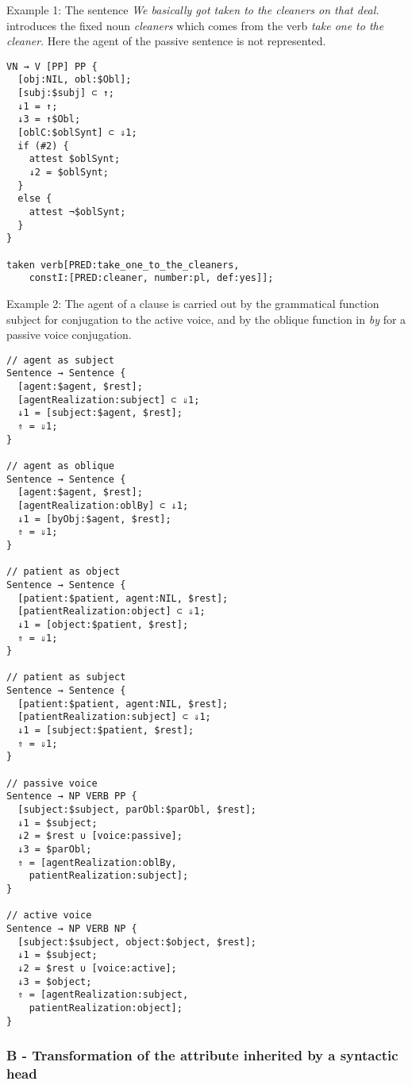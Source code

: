 \documentclass[11pt]{article}
\begin{document}
Example 1: The sentence \textit{We basically got taken to the cleaners
  on that deal.} introduces the fixed noun \textit{cleaners} which
comes from the verb \textit{take one to the cleaner}. Here the agent of the
passive sentence is not represented.

\begin{lstlisting}
VN → V [PP] PP {
  [obj:NIL, obl:$Obl];
  [subj:$subj] ⊂ ↑;
  ↓1 = ↑;
  ↓3 = ↑$Obl;
  [oblC:$oblSynt] ⊂ ⇓1;
  if (#2) {
    attest $oblSynt;
    ↓2 = $oblSynt;
  }
  else {
    attest ¬$oblSynt;
  }
}

taken verb[PRED:take_one_to_the_cleaners, 
	constI:[PRED:cleaner, number:pl, def:yes]];
\end{lstlisting}

Example 2:
The agent of a clause is carried out by the grammatical function subject
for conjugation to the active voice, and by the oblique function in
\textit{by} for a passive voice conjugation.

\begin{lstlisting}
// agent as subject
Sentence → Sentence {
  [agent:$agent, $rest];
  [agentRealization:subject] ⊂ ⇓1;
  ↓1 = [subject:$agent, $rest];
  ⇑ = ⇓1;
}

// agent as oblique
Sentence → Sentence {
  [agent:$agent, $rest];
  [agentRealization:oblBy] ⊂ ⇓1;
  ↓1 = [byObj:$agent, $rest];
  ⇑ = ⇓1;
}

// patient as object
Sentence → Sentence {
  [patient:$patient, agent:NIL, $rest];
  [patientRealization:object] ⊂ ⇓1;
  ↓1 = [object:$patient, $rest];
  ⇑ = ⇓1;
}

// patient as subject
Sentence → Sentence {
  [patient:$patient, agent:NIL, $rest];
  [patientRealization:subject] ⊂ ⇓1;
  ↓1 = [subject:$patient, $rest];
  ⇑ = ⇓1;
}

// passive voice
Sentence → NP VERB PP {
  [subject:$subject, parObl:$parObl, $rest];
  ↓1 = $subject;
  ↓2 = $rest ∪ [voice:passive];
  ↓3 = $parObl;
  ⇑ = [agentRealization:oblBy, 
	patientRealization:subject];
}

// active voice
Sentence → NP VERB NP {
  [subject:$subject, object:$object, $rest];
  ↓1 = $subject;
  ↓2 = $rest ∪ [voice:active];
  ↓3 = $object;
  ⇑ = [agentRealization:subject, 
	patientRealization:object];
}
\end{lstlisting}

\subsubsection*{B - Transformation of the attribute inherited by a syntactic head}
\end{document}
